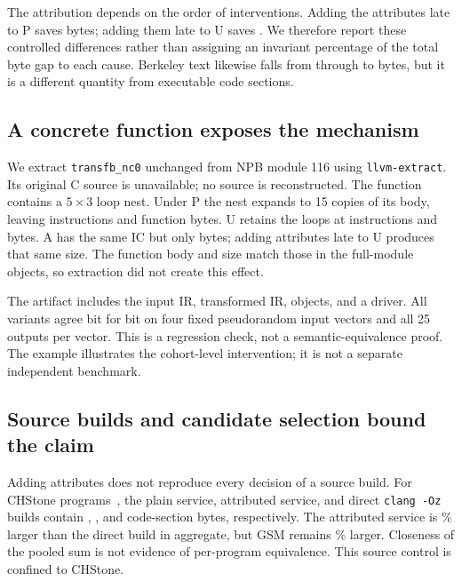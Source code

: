 \documentclass[conference,a4paper]{IEEEtran}
\begin{document}
The attribution depends on the order of interventions. Adding the
attributes late to P saves \PlainLateCodeDelta{} bytes; adding them
late to U saves \LateCodeDelta{}. We therefore report these controlled
differences rather than assigning an invariant percentage of the total
byte gap to each cause. Berkeley text likewise falls from
\PlainBerkeley{} through \UnrollBerkeley{} to \AttrBerkeley{} bytes,
but it is a different quantity from executable code sections.

\subsection{A concrete function exposes the mechanism}
We extract \texttt{transfb\_nc0} unchanged from NPB module 116 using
\texttt{llvm-extract}. Its original C source is unavailable; no source
is reconstructed. The function contains a $5\times3$ loop nest.
Under P the nest expands to 15 copies of its body, leaving
\ExamplePlainIc{} instructions and \ExamplePlainBytes{} function bytes.
U retains the loops at \ExampleUnrollIc{} instructions and
\ExampleUnrollBytes{} bytes. A has the same IC but only
\ExampleAttrBytes{} bytes; adding attributes late to U produces that
same size. The function body and size match those in the full-module
objects, so extraction did not create this effect.

The artifact includes the input IR, transformed IR, objects, and a
driver. All variants agree bit for bit on four fixed pseudorandom
input vectors and all 25 outputs per vector. This is a regression
check, not a semantic-equivalence proof. The example illustrates the
cohort-level intervention; it is not a separate independent benchmark.

\subsection{Source builds and candidate selection bound the claim}
Adding attributes does not reproduce every decision of a source build.
For \SourceCount{} CHStone programs~\cite{chstone}, the plain service,
attributed service, and direct \texttt{clang -Oz} builds contain
\SourcePlainBytes{}, \SourceAttrBytes{}, and \SourceClangBytes{}
code-section bytes, respectively. The attributed service is
\SourceAttrOverClang\% larger than the direct build in aggregate, but GSM remains
\GsmOverClang\% larger. Closeness of the pooled sum is not evidence
of per-program equivalence. This source control is confined to CHStone.
\end{document}
